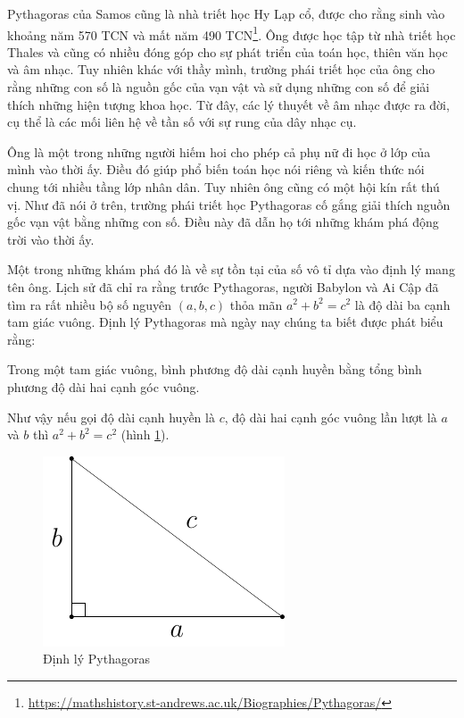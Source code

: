 Pythagoras của Samos cũng là nhà triết học Hy Lạp cổ, được cho rằng sinh vào khoảng năm 570 TCN và mất năm  490 TCN\footnote{\url{https://mathshistory.st-andrews.ac.uk/Biographies/Pythagoras/}}. Ông được học tập từ nhà triết học Thales và cũng có nhiều đóng góp cho sự phát triển của toán học, thiên văn học và âm nhạc. Tuy nhiên khác với thầy mình, trường phái triết học của ông cho rằng những con số là nguồn gốc của vạn vật và sử dụng những con số để giải thích những hiện tượng khoa học. Từ đây, các lý thuyết về âm nhạc được ra đời, cụ thể là các mối liên hệ về tần số với sự rung của dây nhạc cụ.

Ông là một trong những người hiếm hoi cho phép cả phụ nữ đi học ở lớp của mình vào thời ấy. Điều đó giúp phổ biến toán học nói riêng và kiến thức nói chung tới nhiều tầng lớp nhân dân. Tuy nhiên ông cũng có một hội kín rất thú vị. Như đã nói ở trên, trường phái triết học Pythagoras cố gắng giải thích nguồn gốc vạn vật bằng những con số. Điều này đã dẫn họ tới những khám phá động trời vào thời ấy.

Một trong những khám phá đó là về sự tồn tại của số vô tỉ dựa vào định lý mang tên ông. Lịch sử đã chỉ ra rằng trước Pythagoras, người Babylon và Ai Cập đã tìm ra rất nhiều bộ số nguyên $(a, b, c)$ thỏa mãn $a^2 + b^2 = c^2$ là độ dài ba cạnh tam giác vuông. Định lý Pythagoras mà ngày nay chúng ta biết được phát biểu rằng:

\begin{theorem}
    Trong một tam giác vuông, bình phương độ dài cạnh huyền bằng tổng bình phương độ dài hai cạnh góc vuông.
\end{theorem}

Như vậy nếu gọi độ dài cạnh huyền là $c$, độ dài hai cạnh góc vuông lần lượt là $a$ và $b$ thì $a^2 + b^2 = c^2$ (hình \ref{pythagoras1}).

\begin{figure}[ht]
	\centering
	\includegraphics{analytic_geometry/pythagoras1.pdf}
	\caption{Định lý Pythagoras}
	\label{pythagoras1}
\end{figure}

